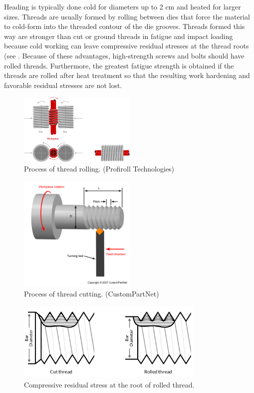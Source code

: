 \documentclass[
10pt,
a4paper,
openany,
svgnames,
]{book}
\begin{document}
Heading is typically done cold for diameters up to 2 cm and heated for larger sizes. Threads are usually formed by rolling between dies that force the material to cold-form into the threaded contour of the die grooves. Threads formed this way are stronger than cut or ground threads in fatigue and impact loading because cold working can leave compressive residual stresses at the thread roots (see . Because of these advantages, high-strength screws and bolts should have rolled threads. Furthermore, the greatest fatigue strength is obtained if the threads are rolled after heat treatment so that the resulting work hardening and favorable residual stresses are not lost.

\begin{figure}[h]
  \centering
  \includegraphics[width=0.5\textwidth]{pictures/Bolt/thread-rolling}
  \caption{Process of thread rolling. (Profiroll Technologies)}
\end{figure}

\begin{figure}[h]
  \centering
  \includegraphics[width=0.5\textwidth]{pictures/Bolt/thread-cutting}
  \caption{Process of thread cutting. (CustomPartNet)}
\end{figure}

\begin{figure}[h]
  \centering
  \includegraphics[width=0.8\textwidth]{pictures/Bolt/cut-rolled-thread}
  \caption{Compressive residual stress at the root of rolled thread.}
\end{figure}
\end{document}
